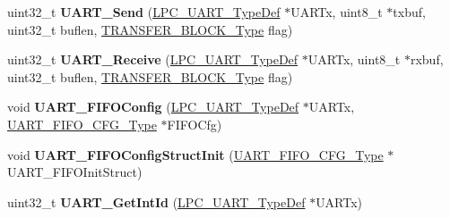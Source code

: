 \begin{DoxyCompactItemize}
\item 
\hypertarget{group___u_a_r_t___public___functions_gadeb1a6a95247931abb93fa49571ae51c}{uint32\-\_\-t {\bfseries \-U\-A\-R\-T\-\_\-\-Send} (\hyperlink{struct_l_p_c___u_a_r_t___type_def}{\-L\-P\-C\-\_\-\-U\-A\-R\-T\-\_\-\-Type\-Def} $\ast$\-U\-A\-R\-Tx, uint8\-\_\-t $\ast$txbuf, uint32\-\_\-t buflen, \hyperlink{group___l_p_c___types___public___types_gaddb88bff95842be0c54e0e979f45cf95}{\-T\-R\-A\-N\-S\-F\-E\-R\-\_\-\-B\-L\-O\-C\-K\-\_\-\-Type} flag)}\label{group___u_a_r_t___public___functions_gadeb1a6a95247931abb93fa49571ae51c}

\item 
\hypertarget{group___u_a_r_t___public___functions_ga83868ce3b59f46e618c4fc4d864895a1}{uint32\-\_\-t {\bfseries \-U\-A\-R\-T\-\_\-\-Receive} (\hyperlink{struct_l_p_c___u_a_r_t___type_def}{\-L\-P\-C\-\_\-\-U\-A\-R\-T\-\_\-\-Type\-Def} $\ast$\-U\-A\-R\-Tx, uint8\-\_\-t $\ast$rxbuf, uint32\-\_\-t buflen, \hyperlink{group___l_p_c___types___public___types_gaddb88bff95842be0c54e0e979f45cf95}{\-T\-R\-A\-N\-S\-F\-E\-R\-\_\-\-B\-L\-O\-C\-K\-\_\-\-Type} flag)}\label{group___u_a_r_t___public___functions_ga83868ce3b59f46e618c4fc4d864895a1}

\item 
\hypertarget{group___u_a_r_t___public___functions_ga91f3bb9558513f4a1da4163997bd198b}{void {\bfseries \-U\-A\-R\-T\-\_\-\-F\-I\-F\-O\-Config} (\hyperlink{struct_l_p_c___u_a_r_t___type_def}{\-L\-P\-C\-\_\-\-U\-A\-R\-T\-\_\-\-Type\-Def} $\ast$\-U\-A\-R\-Tx, \hyperlink{struct_u_a_r_t___f_i_f_o___c_f_g___type}{\-U\-A\-R\-T\-\_\-\-F\-I\-F\-O\-\_\-\-C\-F\-G\-\_\-\-Type} $\ast$\-F\-I\-F\-O\-Cfg)}\label{group___u_a_r_t___public___functions_ga91f3bb9558513f4a1da4163997bd198b}

\item 
\hypertarget{group___u_a_r_t___public___functions_ga84c4e278cf63acef81e359b76d28319a}{void {\bfseries \-U\-A\-R\-T\-\_\-\-F\-I\-F\-O\-Config\-Struct\-Init} (\hyperlink{struct_u_a_r_t___f_i_f_o___c_f_g___type}{\-U\-A\-R\-T\-\_\-\-F\-I\-F\-O\-\_\-\-C\-F\-G\-\_\-\-Type} $\ast$\-U\-A\-R\-T\-\_\-\-F\-I\-F\-O\-Init\-Struct)}\label{group___u_a_r_t___public___functions_ga84c4e278cf63acef81e359b76d28319a}

\item 
\hypertarget{group___u_a_r_t___public___functions_ga09314371b86b1597b7aafd912cf6222f}{uint32\-\_\-t {\bfseries \-U\-A\-R\-T\-\_\-\-Get\-Int\-Id} (\hyperlink{struct_l_p_c___u_a_r_t___type_def}{\-L\-P\-C\-\_\-\-U\-A\-R\-T\-\_\-\-Type\-Def} $\ast$\-U\-A\-R\-Tx)}\label{group___u_a_r_t___public___functions_ga09314371b86b1597b7aafd912cf6222f}


\end{DoxyCompactItemize}
